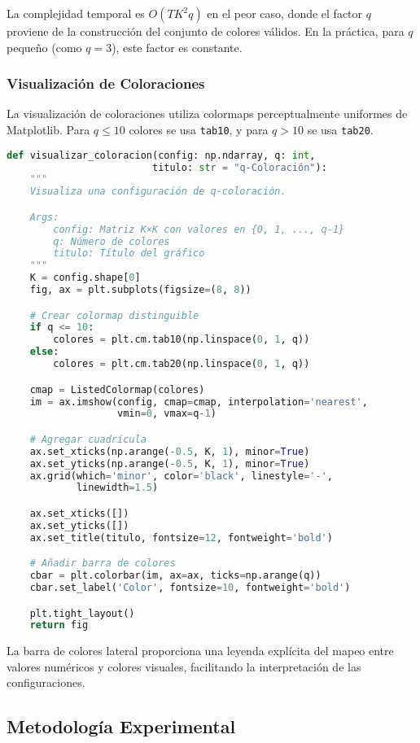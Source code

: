 La complejidad temporal es $O(TK^2 q)$ en el peor caso, donde el factor $q$ proviene de la construcción del conjunto de colores válidos. En la práctica, para $q$ pequeño (como $q=3$), este factor es constante.

\subsubsection{Visualización de Coloraciones}

La visualización de coloraciones utiliza colormaps perceptualmente uniformes de Matplotlib. Para $q \leq 10$ colores se usa \texttt{tab10}, y para $q > 10$ se usa \texttt{tab20}.

\begin{lstlisting}[language=Python]
def visualizar_coloracion(config: np.ndarray, q: int,
                         titulo: str = "q-Coloración"):
    """
    Visualiza una configuración de q-coloración.

    Args:
        config: Matriz K×K con valores en {0, 1, ..., q-1}
        q: Número de colores
        titulo: Título del gráfico
    """
    K = config.shape[0]
    fig, ax = plt.subplots(figsize=(8, 8))

    # Crear colormap distinguible
    if q <= 10:
        colores = plt.cm.tab10(np.linspace(0, 1, q))
    else:
        colores = plt.cm.tab20(np.linspace(0, 1, q))

    cmap = ListedColormap(colores)
    im = ax.imshow(config, cmap=cmap, interpolation='nearest',
                   vmin=0, vmax=q-1)

    # Agregar cuadrícula
    ax.set_xticks(np.arange(-0.5, K, 1), minor=True)
    ax.set_yticks(np.arange(-0.5, K, 1), minor=True)
    ax.grid(which='minor', color='black', linestyle='-',
            linewidth=1.5)

    ax.set_xticks([])
    ax.set_yticks([])
    ax.set_title(titulo, fontsize=12, fontweight='bold')

    # Añadir barra de colores
    cbar = plt.colorbar(im, ax=ax, ticks=np.arange(q))
    cbar.set_label('Color', fontsize=10, fontweight='bold')

    plt.tight_layout()
    return fig
\end{lstlisting}

La barra de colores lateral proporciona una leyenda explícita del mapeo entre valores numéricos y colores visuales, facilitando la interpretación de las configuraciones.

\subsection{Metodología Experimental}

